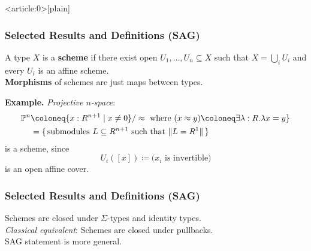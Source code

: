 \documentclass{beamer}
\begin{document}
{ %
    \begin{frame}<article:0>[plain]
     \end{frame}
}


\begin{frame}
  \frametitle{Selected Results and Definitions (SAG)}
  A type $X$ is a \textbf{scheme} if
  there exist open $U_1, \dots, U_n \subseteq X$
  such that $X = \bigcup_i U_i$
  and every $U_i$ is an affine scheme. \\
  \vspace{5mm}
  \pause
  \textbf{Morphisms} of schemes are just maps between types.
  
  \pause
  \vspace{5mm}
  \textbf{Example.}
  \emph{Projective $n$-space}:
  \begin{align*}
    \bP^n
    &\coloneq \{x : R^{n+1}\mid x\neq 0\}/\approx\text{ where $(x\approx y)\coloneq \exists \lambda:R. \lambda x= y$}\} \\
    &= \{\,\text{submodules $L\subseteq R^{n+1}$ such that $\|L=R^1\|$}\,\}
  \end{align*}
  is a scheme, since
  \[
    U_i([x]) \coloneq \text{($x_i$ is invertible)}
  \]
  is an open affine cover.
\end{frame}

\begin{frame}
  \frametitle{Selected Results and Definitions (SAG)}
  Schemes are closed under $\Sigma$-types and identity types. \\
  \pause
  \vspace{1cm}
  \emph{Classical equivalent}: Schemes are closed under pullbacks. \\
  \pause
  \vspace{1cm}
  SAG statement is more general. \\
  \vspace{1cm}
\end{frame}
\end{document}
